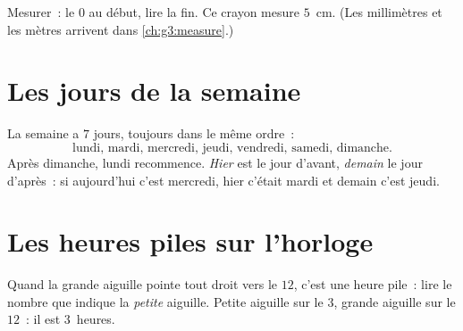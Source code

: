 \begin{omfigure}

{\small Mesurer~: le $0$ au début, lire la fin. Ce crayon mesure
$5$~cm. (Les millimètres et les mètres arrivent dans
\cref{ch:g3:measure}.)}
\end{omfigure}

\section{Les jours de la semaine}

\begin{example}\label{ex:g1:measure:days}
La semaine a $7$ jours, toujours dans le même ordre~:
\[
\text{lundi, mardi, mercredi, jeudi, vendredi, samedi,
dimanche.}
\]
Après dimanche, lundi recommence. \emph{Hier} est le jour
d'avant, \emph{demain} le jour d'après~: si aujourd'hui c'est
mercredi, hier c'était mardi et demain c'est jeudi.
\end{example}

\section{Les heures piles sur l'horloge}

\begin{method}\label{met:g1:measure:clock}
Quand la grande aiguille pointe tout droit vers le $12$, c'est une
heure pile~: lire le nombre que indique la \emph{petite} aiguille.
Petite aiguille sur le $3$, grande aiguille sur le $12$~: il est
$3$~heures.
\end{method}

